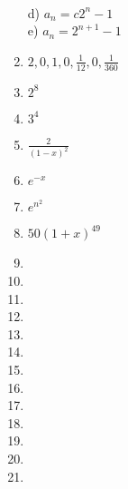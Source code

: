 \documentclass[11pt]{article}
\begin{document}
\begin{enumerate}
	\\d) $a_n = c2^n - 1$
	\\e) $a_n = 2^{n + 1} - 1$
\item $2,0,1,0,\frac{1}{12},0,\frac{1}{360}$
\item $2^8$
\item $3^4$
\item $\frac{2}{(1-x)^2}$
\item $e^{-x}$
\item $e^{n^2}$
\item $50(1+x)^{49}$
\item 
\item 
\item 
\item 
\item 
\item 
\item 
\item 
\item 
\item 
\item 
\item 
\item 
\end{enumerate}
\end{document}

